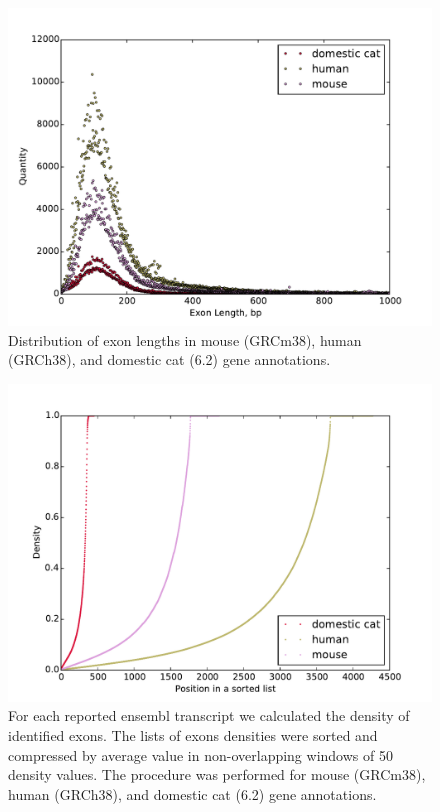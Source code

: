 \documentclass{article}
\begin{document}
\begin{figure}[h]
\centering
\includegraphics[width=\textwidth]{images/exon_distr_human_mouse_cat.pdf}
\caption{Distribution of exon lengths in mouse (GRCm38), human (GRCh38), and domestic cat (6.2) gene annotations.}
\label{fig:human_mouse_cat_exons}
\end{figure}


\begin{figure}[h]
\centering
\includegraphics[width=\textwidth]{images/exon_density_human_mouse_cat.pdf}
\caption{For each reported ensembl transcript we calculated the density of identified exons. The lists of exons densities were sorted and compressed by average value in non-overlapping windows of 50 density values. The procedure was performed for mouse (GRCm38), human (GRCh38), and domestic cat (6.2) gene annotations.}
\label{fig:human_mouse_cat_exon_density}
\end{figure}
\end{document}
